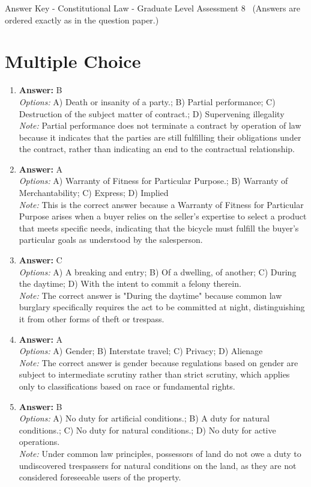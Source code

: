 \documentclass[12pt]{article}
\begin{document}
\begin{center}
Answer Key - Constitutional Law - Graduate Level Assessment 8 \
\small (Answers are ordered exactly as in the question paper.)
\end{center}

\section*{Multiple Choice}
\begin{enumerate}[label=\arabic*.]
\item \textbf{Answer:} B
\\ \textit{Options:} A) Death or insanity of a party.; B) Partial performance; C) Destruction of the subject matter of contract.; D) Supervening illegality
\\ \textit{Note:} Partial performance does not terminate a contract by operation of law because it indicates that the parties are still fulfilling their obligations under the contract, rather than indicating an end to the contractual relationship.
\item \textbf{Answer:} A
\\ \textit{Options:} A) Warranty of Fitness for Particular Purpose.; B) Warranty of Merchantability; C) Express; D) Implied
\\ \textit{Note:} This is the correct answer because a Warranty of Fitness for Particular Purpose arises when a buyer relies on the seller's expertise to select a product that meets specific needs, indicating that the bicycle must fulfill the buyer's particular goals as understood by the salesperson.
\item \textbf{Answer:} C
\\ \textit{Options:} A) A breaking and entry; B) Of a dwelling, of another; C) During the daytime; D) With the intent to commit a felony therein.
\\ \textit{Note:} The correct answer is "During the daytime" because common law burglary specifically requires the act to be committed at night, distinguishing it from other forms of theft or trespass.
\item \textbf{Answer:} A
\\ \textit{Options:} A) Gender; B) Interstate travel; C) Privacy; D) Alienage
\\ \textit{Note:} The correct answer is gender because regulations based on gender are subject to intermediate scrutiny rather than strict scrutiny, which applies only to classifications based on race or fundamental rights.
\item \textbf{Answer:} B
\\ \textit{Options:} A) No duty for artificial conditions.; B) A duty for natural conditions.; C) No duty for natural conditions.; D) No duty for active operations.
\\ \textit{Note:} Under common law principles, possessors of land do not owe a duty to undiscovered trespassers for natural conditions on the land, as they are not considered foreseeable users of the property.
\end{enumerate}
\end{document}
